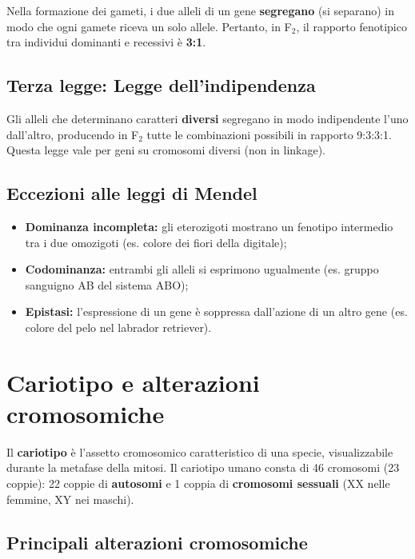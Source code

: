 \documentclass[11pt,a4paper,openright,twoside]{book}
\theoremstyle{definition}
\theoremstyle{plain}
\theoremstyle{remark}
\begin{document}
Nella formazione dei gameti, i due alleli di un gene \textbf{segregano} (si separano) in modo che ogni gamete riceva un solo allele. Pertanto, in F$_2$, il rapporto fenotipico tra individui dominanti e recessivi è \textbf{3:1}.

\subsection{Terza legge: Legge dell'indipendenza}

Gli alleli che determinano caratteri \textbf{diversi} segregano in modo indipendente l'uno dall'altro, producendo in F$_2$ tutte le combinazioni possibili in rapporto 9:3:3:1. Questa legge vale per geni su cromosomi diversi (non in linkage).

\subsection{Eccezioni alle leggi di Mendel}

\begin{itemize}
  \item \textbf{Dominanza incompleta:} gli eterozigoti mostrano un fenotipo intermedio tra i due omozigoti (es. colore dei fiori della digitale);
  \item \textbf{Codominanza:} entrambi gli alleli si esprimono ugualmente (es. gruppo sanguigno AB del sistema ABO);
  \item \textbf{Epistasi:} l'espressione di un gene è soppressa dall'azione di un altro gene (es. colore del pelo nel labrador retriever).
\end{itemize}

\section{Cariotipo e alterazioni cromosomiche}

Il \textbf{cariotipo} è l'assetto cromosomico caratteristico di una specie, visualizzabile durante la metafase della mitosi. Il cariotipo umano consta di 46 cromosomi (23 coppie): 22 coppie di \textbf{autosomi} e 1 coppia di \textbf{cromosomi sessuali} (XX nelle femmine, XY nei maschi).

\subsection{Principali alterazioni cromosomiche}
\end{document}
